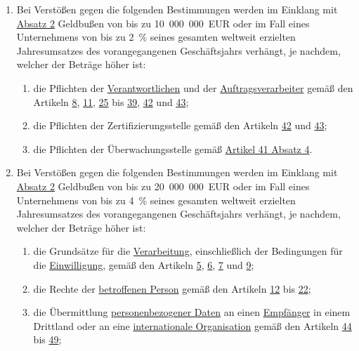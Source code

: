 \begin{enumerate}
  \item Bei Verstößen gegen die folgenden Bestimmungen werden im Einklang mit \hyperref[itm:83-2]{Absatz 2} Geldbußen
   von bis zu 10~000~000~EUR oder im Fall eines Unternehmens von bis zu 2~\% seines gesamten weltweit erzielten
   Jahresumsatzes des vorangegangenen Geschäftsjahrs verhängt, je nachdem, welcher der Beträge höher ist:%
  \label{itm:83-4}

  \begin{enumerate}
  
    \item die Pflichten der \hyperref[itm:04-7]{Verantwortlichen} und der \hyperref[itm:04-8]{Auftragsverarbeiter} gemäß
     den Artikeln \hyperref[ch:8]{8},
     \hyperref[ch:11]{11}, \hyperref[ch:25]{25} bis \hyperref[ch:39]{39}, \hyperref[ch:42]{42} und \hyperref[ch:43]
      {43};%
    \label{itm:83-4a}

    \item die Pflichten der Zertifizierungsstelle gemäß den Artikeln \hyperref[ch:42]{42} und \hyperref[ch:43]{43};%
    \label{itm:83-4b}

    \item die Pflichten der Überwachungsstelle gemäß \hyperref[itm:41-4]{Artikel 41 Absatz 4}.%
    \label{itm:83-4c}

  \end{enumerate}

  \item Bei Verstößen gegen die folgenden Bestimmungen werden im Einklang mit \hyperref[itm:83-2]{Absatz 2} Geldbußen
   von bis zu 20~000~000~EUR oder im Fall eines Unternehmens von bis zu 4~\% seines gesamten weltweit erzielten
   Jahresumsatzes des vorangegangenen Geschäftsjahrs verhängt, je nachdem, welcher der Beträge höher ist:%
  \label{itm:83-5}

  \begin{enumerate}
  
    \item die Grundsätze für die \hyperref[itm:04-2]{Verarbeitung}, einschließlich der Bedingungen für die \hyperref
     [itm:04-11]{Einwilligung}, gemäß den Artikeln
     \hyperref[ch:5]{5}, \hyperref[ch:6]{6}, \hyperref[ch:7]{7} und \hyperref[ch:9]{9};%
    \label{itm:83-5a}

    \item die Rechte der \hyperref[itm:04-1]{betroffenen Person} gemäß den Artikeln \hyperref[ch:12]{12} bis \hyperref
     [ch:22]{22};%
    \label{itm:83-5b}

    \item die Übermittlung \hyperref[itm:04-1]{personenbezogener Daten} an einen \hyperref[itm:04-9]{Empfänger} in einem
     Drittland oder an eine \hyperref[itm:04-26]{internationale Organisation} gemäß den Artikeln \hyperref[ch:44]
     {44} bis \hyperref[ch:49]{49};%
    \label{itm:83-5c}


\end{enumerate}
\end{enumerate}
